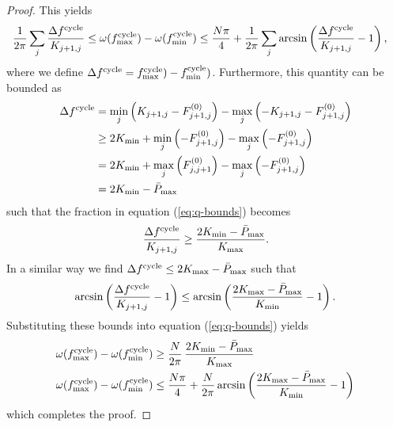 \documentclass[10pt,aps,pre,preprint,superscriptaddress]{revtex4-1}
\newcommand{\nn}{\nonumber}
\begin{document}
\begin{proof}
This yields 
\begin{align}
\label{eq:q-bounds}
   \frac{1}{2\pi} \sum_j\frac{\Delta f^{\rm cycle}}{K_{j+1,j}} &\leq 
    \omega(f^{\rm cycle}_{\rm max}) - \omega(f^{\rm cycle}_{\rm min}) \leq 
    \frac{N \pi}{4} +  \frac{1}{2\pi} \sum_{j} \arcsin\left(\frac{\Delta f^{\rm cycle}}{K_{j+1,j}} - 1\right),
\end{align}
where we define $\Delta f^{\rm cycle} = f^{\rm cycle}_{\rm max}) - f^{\rm cycle}_{\rm min})$.
Furthermore, this quantity can be bounded as
\begin{align}
  \Delta f^{\rm cycle} &= \min_j \left( K _{j+1,j} - F_{j+1,j}^{(0)} \right) -
                     \max_j  \left( - K _{j+1,j} - F_{j+1,j}^{(0)} \right) \nn \\
               & \geq 2 K_{\rm min} +  \min_j \left( - F_{j+1,j}^{(0)} \right)
                      - \max_j  \left( - F_{j+1,j}^{(0)} \right) \nn \\
               & = 2 K_{\rm min} +  \max_j \left( F_{j,j+1}^{(0)} \right)
                      - \max_j  \left( - F_{j+1,j}^{(0)} \right) \nn \\       
               & = 2 K_{\rm min}- \bar P_{\rm max}  
\end{align}
such that the fraction in equation (\ref{eq:q-bounds}) becomes
\begin{align}
     \frac{\Delta f^{\rm cycle}}{K_{j+1,j}} \geq  \frac{2 K_{\rm min}- \bar P_{\rm max}}{K_{\rm max}} .
\end{align}
In a similar way we find $\Delta f^{\rm cycle} \leq 2 K_{\rm max}- \bar P_{\rm max}$ such that
\begin{align}
   \arcsin\left(\frac{\Delta f^{\rm cycle}}{K_{j+1,j}} - 1 \right) \leq
      \arcsin\left(\frac{2 K_{\rm max}- \bar P_{\rm max}}{K_{\rm min}} - 1 \right) .
\end{align}
Substituting these bounds into equation (\ref{eq:q-bounds}) yields
\begin{align}
  \omega(f^{\rm cycle}_{\rm max}) - \omega(f^{\rm cycle}_{\rm min})
      & \geq \frac{N}{2\pi} \, \frac{2 K_{\rm min}- \bar P_{\rm max}}{K_{\rm max}} \nn \\
  \omega(f^{\rm cycle}_{\rm max}) - \omega(f^{\rm cycle}_{\rm min})
       & \leq \frac{N \pi}{4} + 
      \frac{N}{2\pi}  \arcsin\left(\frac{2 K_{\rm max}- \bar P_{\rm max}}{K_{\rm min}} - 1 \right) 
\end{align}
which completes the proof.
\end{proof}
\end{document}
